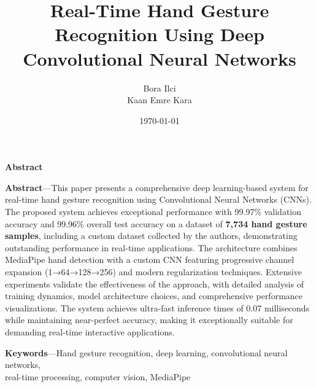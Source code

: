 \documentclass[11pt,a4paper,twoside]{article}
\title{Real-Time Hand Gesture Recognition Using Deep Convolutional Neural Networks}
\author{Bora Ilci \\ Kaan Emre Kara}
\date{\today}
\begin{document}
\maketitle

\tableofcontents
\newpage

\begin{center}
\colorbox{abstractcolor}{%
\begin{minipage}{0.9\textwidth}
\vspace{0.5cm}
\begin{center}
{\Large\bfseries Abstract}
\end{center}
\vspace{0.3cm}

\textbf{Abstract}---This paper presents a comprehensive deep
learning-based system for real-time hand gesture recognition using
Convolutional Neural Networks (CNNs). The proposed system achieves
exceptional performance with 99.97\% validation accuracy and 99.96\%
overall test accuracy on a dataset of \textbf{7,734 hand gesture samples},
including a custom dataset collected by the authors, demonstrating outstanding performance in real-time applications. The
architecture combines MediaPipe hand detection with a custom CNN
featuring progressive channel expansion (1→64→128→256) and modern
regularization techniques. Extensive experiments validate the
effectiveness of the approach, with detailed analysis of training
dynamics, model architecture choices, and comprehensive performance
visualizations. The system achieves ultra-fast inference times of 0.07
milliseconds while maintaining near-perfect accuracy, making it
exceptionally suitable for demanding real-time interactive applications.

\vspace{0.3cm}
\colorbox{keywordcolor}{%
\begin{minipage}{0.92\textwidth}
\small
\centering
\textbf{Keywords}---Hand gesture recognition, deep learning, convolutional neural networks,\\
real-time processing, computer vision, MediaPipe
\end{minipage}
}
\vspace{0.5cm}
\end{minipage}
}
\end{center}

\vspace{1cm}

\end{document}
